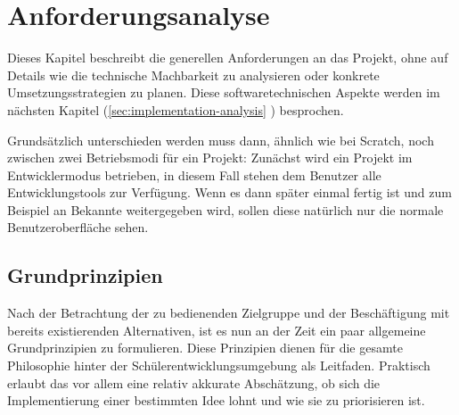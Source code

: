 \documentclass[paper=a4,fontsize=11pt,parskip=half]{scrartcl}
\begin{document}
\section{Anforderungsanalyse}

Dieses Kapitel beschreibt die generellen Anforderungen an das Projekt, ohne auf Details wie die technische Machbarkeit zu analysieren oder konkrete Umsetzungsstrategien zu planen. Diese softwaretechnischen Aspekte werden im nächsten Kapitel (\ref{sec:implementation-analysis} ) besprochen.


Grundsätzlich unterschieden werden muss dann, ähnlich wie bei Scratch, noch zwischen zwei Betriebsmodi für ein Projekt: Zunächst wird ein Projekt im Entwicklermodus betrieben, in diesem Fall stehen dem Benutzer alle Entwicklungstools zur Verfügung. Wenn es dann später einmal fertig ist und zum Beispiel an Bekannte weitergegeben wird, sollen diese natürlich nur die normale Benutzeroberfläche sehen.

\subsection{Grundprinzipien}

Nach der Betrachtung der zu bedienenden Zielgruppe und der Beschäftigung mit bereits existierenden Alternativen, ist es nun an der Zeit ein paar allgemeine Grundprinzipien zu formulieren. Diese Prinzipien dienen für die gesamte Philosophie hinter der Schülerentwicklungsumgebung als Leitfaden. Praktisch erlaubt das vor allem eine relativ akkurate Abschätzung, ob sich die Implementierung einer bestimmten Idee lohnt und wie sie zu priorisieren ist.
\end{document}
